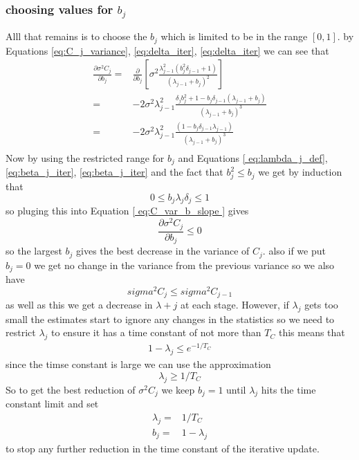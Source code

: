 \documentclass[a4paper,oneside,english]{book}
\numberwithin{equation}{section}
\numberwithin{figure}{section}
\begin{document}
\subsubsection{choosing values for $b_j$}
Alll that remains is to choose  the $b_j$ which is limited to be in the range $[0, 1]$.  by Equations \ref{eq:C_j_variance}, \ref{eq:delta_iter}, \ref{eq:delta_iter} we can see that 
\begin{align}
\frac{\partial \sigma^2 C_j}{\partial b_j}=& \frac{\partial}{\partial b_j} \left[\sigma^2\frac{\lambda_{j-1}^2(b_j^2 \delta_{j-1}+1) }{(\lambda_{j-1}+b_j )^2} \right]\\
=&-2\sigma^2\lambda_{j-1}^2\frac{\delta_j b_j^2 +1  -b_j \delta_{j-1}(\lambda_{j-1}+b_j)}{(\lambda_{j-1} + b_j)^3} \\
=& -2\sigma^2\lambda_{j-1}^2\frac{(1  -b_j \delta_{j-1}\lambda_{j-1})}{(\lambda_{j-1} + b_j)^3} \label{ eq:C_var_b_slope   } \\
\end{align}
Now by using the restricted range for $b_j$ and Equations \ref{ eq:lambda_j_def}, \ref{eq:beta_j_iter}, \ref{eq:beta_j_iter} and the fact that $b_j^2\le b_j$ we get by induction that
\begin{equation}
0 \le b_j \lambda_j \delta_j \le 1
\end{equation}
so pluging this into Equation \ref{ eq:C_var_b_slope   } gives 
\begin{equation}
\frac{\partial \sigma^2 C_j}{\partial b_j} \le 0
\end{equation}
so the largest $b_j$ gives the best decrease in the variance of  $C_j$. also if we put $b_j = 0$ we get no change in the variance  from the previous variance so we also have
\begin{equation}
sigma^2 C_j\le sigma^2 C_{j-1}
\end{equation}
as well as this we get a decrease in $\lambda+j$ at each stage. However, if  $\lambda_j$ gets too small  the estimates start to ignore any changes in the statistics so we need to restrict $\lambda_j$ to ensure it has a time constant of not more than $T_C $ this means that
\begin{align}
1-\lambda_j \le e^{-1/T_C}
\end{align}  
since  the timse constant is large we can use the approximation 
\begin{equation}
\lambda_j \ge 1/T_C
\end{equation}
So to get the best reduction of  $\sigma^2 C_j$ we keep $b_j = 1$ until  $\lambda_j$ hits the time constant limit and set
\begin{align}
\lambda_j =& 1/T_C \\
b_j =& 1-\lambda_j
\end{align}
 to stop any further reduction in the time constant of the iterative update.
 
\end{document}
